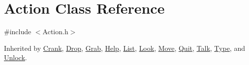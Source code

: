 \hypertarget{class_action}{}\section{Action Class Reference}
\label{class_action}


{\ttfamily \#include $<$Action.\+h$>$}



Inherited by \mbox{\hyperlink{class_crank}{Crank}}, \mbox{\hyperlink{class_drop}{Drop}}, \mbox{\hyperlink{class_grab}{Grab}}, \mbox{\hyperlink{class_help}{Help}}, \mbox{\hyperlink{class_list}{List}}, \mbox{\hyperlink{class_look}{Look}}, \mbox{\hyperlink{class_move}{Move}}, \mbox{\hyperlink{class_quit}{Quit}}, \mbox{\hyperlink{class_talk}{Talk}}, \mbox{\hyperlink{class_type}{Type}}, and \mbox{\hyperlink{class_unlock}{Unlock}}.

